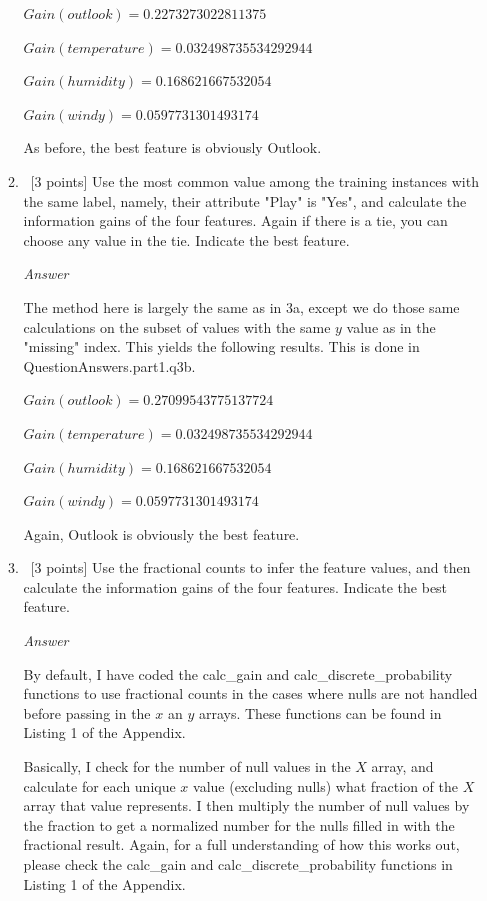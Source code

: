 \documentclass[12pt, fullpage,letterpaper]{article}
\begin{document}
\begin{enumerate}
\begin{enumerate}
\vspace{5mm}

$Gain(outlook)=0.2273273022811375$

$Gain(temperature)=0.032498735534292944$

$Gain(humidity)=0.168621667532054$

$Gain(windy)=0.0597731301493174$

\vspace{5mm}

As before, the best feature is obviously Outlook.

\item~[3 points] Use the most common value among the  training instances with the same label, namely, their attribute "Play" is "Yes", and calculate the information gains of the four features. Again if there is a tie, you can choose any value in the tie. Indicate the best feature.

\emph{Answer}

The method here is largely the same as in 3a, except we do those same calculations on the subset of values with the same $y$ value as in the "missing" index. This yields the following results. This is done in QuestionAnswers.part1.q3b.

\vspace{5mm}

$Gain(outlook)=0.27099543775137724$

$Gain(temperature)=0.032498735534292944$

$Gain(humidity)=0.168621667532054$

$Gain(windy)=0.0597731301493174$

\vspace{5mm}

Again, Outlook is obviously the best feature.

\item~[3 points] Use the fractional counts to infer the feature values, and then calculate the information gains of the four features. Indicate the best feature.

\emph{Answer}

By default, I have coded the calc\_gain and calc\_discrete\_probability functions to use fractional counts in the cases where nulls are not handled before passing in the $x$ an $y$ arrays. These functions can be found in Listing 1 of the Appendix. 

\vspace{5mm}

Basically, I check for the number of null values in the $X$ array, and calculate for each unique $x$ value (excluding nulls) what fraction of the $X$ array that value represents. I then multiply the number of null values by the fraction to get a normalized number for the nulls filled in with the fractional result. Again, for a full understanding of how this works out, please check the calc\_gain and calc\_discrete\_probability functions  in Listing 1 of the Appendix.


\end{enumerate}
\end{enumerate}
\end{document}
